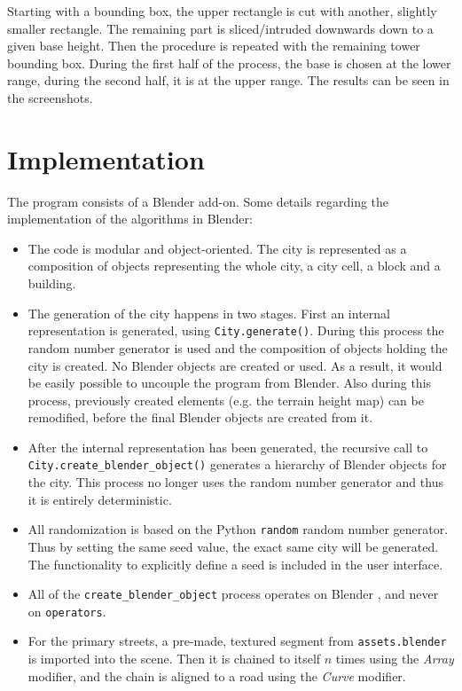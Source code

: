 \documentclass[a4paper,12pt]{scrartcl}
\begin{document}
Starting with a bounding box, the upper rectangle is cut with another, slightly smaller rectangle. The remaining part is sliced/intruded downwards down to a given base height. Then the procedure is repeated with the remaining tower bounding box. During the first half of the process, the base is chosen at the lower range, during the second half, it is at the upper range. The results can be seen in the screenshots.


\section{Implementation}
\label{sec:implementation}
The program consists of a Blender add-on. Some details regarding the implementation of the algorithms in Blender:
\begin{itemize}
\item The code is modular and object-oriented. The city is represented as a composition of objects representing the whole city, a city cell, a block and a building.
\item The generation of the city happens in two stages. First an internal representation is generated, using \texttt{City.generate()}. During this process the random number generator is used and the composition of objects holding the city is created. No Blender objects are created or used. As a result, it would be easily possible to uncouple the program from Blender. Also during this process, previously created elements (e.g. the terrain height map) can be remodified, before the final Blender objects are created from it.
\item After the internal representation has been generated, the recursive call to \\ \texttt{City.create\_blender\_object()} generates a hierarchy of Blender objects for the city. This process no longer uses the random number generator and thus it is entirely deterministic.
\item All randomization is based on the Python \texttt{random} random number generator. Thus by setting the same seed value, the exact same city will be generated. The functionality to explicitly define a seed is included in the user interface.
\item All of the \texttt{create\_blender\_object} process operates on Blender , and never on \texttt{operators}.
\item For the primary streets, a pre-made, textured segment from \texttt{assets.blender} is imported into the scene. Then it is chained to itself $n$ times using the \emph{Array} modifier, and the chain is aligned to a road using the \emph{Curve} modifier.

\end{itemize}
\end{document}
